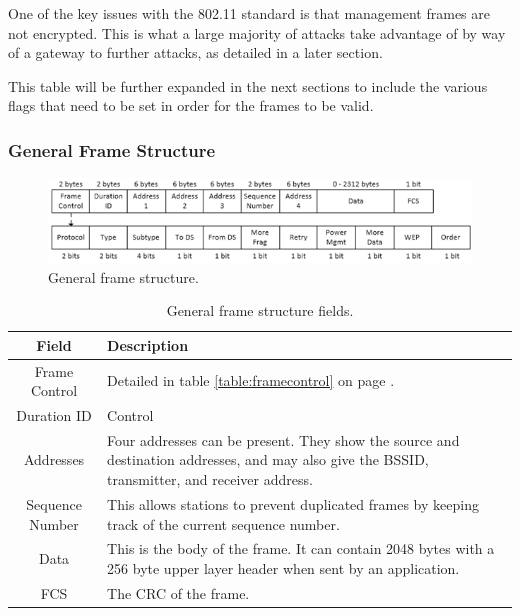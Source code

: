 One of the key issues with the 802.11 standard is that management frames are not encrypted. This is what a large majority of attacks take advantage of by way of a gateway to further attacks, as detailed in a later section.

This table will be further expanded in the next sections to include the various flags that need to be set in order for the frames to be valid.

\subsubsection{General Frame Structure}

\begin{figure}[htb!]
\centering\includegraphics[width=\linewidth]{research/80211/figures/framestructure.png}
\caption{General frame structure.}
\end{figure}

	\begin{table}[!h]
\begin{center}
	\begin{tabular}{| c |  p{5cm} |}
		\hline
		\textbf{Field} & \textbf{Description} \\ \hline
		Frame Control & Detailed in table \ref{table:framecontrol} on page \pageref{table:framecontrol}.\\ \hline
		Duration ID & Control \\ \hline
		Addresses & Four addresses can be present.  They show the source and destination addresses, and may also give the BSSID, transmitter, and receiver address.  \\ \hline
		Sequence Number & This allows stations to prevent duplicated frames by keeping track of the current sequence number. \\ \hline
		Data & This is the body of the frame. It can contain 2048 bytes with a 256 byte upper layer header when sent by an application. \\ \hline
		FCS & The CRC \cite{research:crc_wiki} of the frame. \\ \hline
	\end{tabular}
	\caption{General frame structure fields.}
	\label{table:framefields}
\end{center}
	\end{table}

